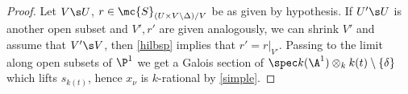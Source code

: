 \begin{TC}
\begin{proof}
		Let $V\s U$, $r\in\mc{S}_{(U\times V\setminus\Delta)/V}$ be as given by hypothesis. If $U'\s U$ is another open subset and $V',r'$ are given analogously, we can shrink $V'$ and assume that $V'\s V$, then \autoref{hilbsp} implies that $r'=r|_{V'}$. Passing to the limit along open subsets of $\P^{1}$ we get a Galois section of $\spec k(\A^{1})\otimes_{k}k(t)\setminus\{\delta\}$ which lifts $s_{k(t)}$, hence $x_{\nu}$ is $k$-rational by \autoref{simple}.
	\end{proof}
\end{TC}



